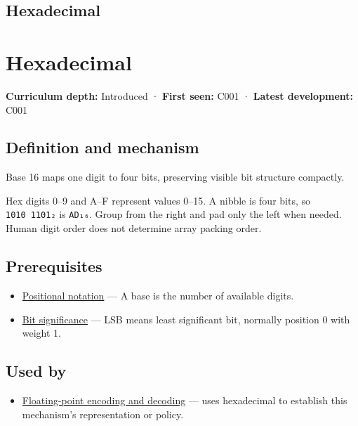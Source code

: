 \hypertarget{appendix-6b8075763724}{}
\section*{Hexadecimal}
\chapter{Hexadecimal}\label{appendix-6b8075763724-hexadecimal}

\textbf{Curriculum depth:} Introduced · \textbf{First seen:} C001 · \textbf{Latest development:} C001

\section{Definition and mechanism}\label{appendix-6b8075763724-definition-and-mechanism}

Base 16 maps one digit to four bits, preserving visible bit structure compactly.

Hex digits 0--9 and A--F represent values 0--15. A nibble is four bits, so \texttt{1010\ 1101₂} is \texttt{AD₁₆}. Group from the right and pad only the left when needed. Human digit order does not determine array packing order.

\section{Prerequisites}\label{appendix-6b8075763724-prerequisites}

\begin{itemize}
\tightlist
\item
  \hyperref[appendix-83c3f28f7bda]{Positional notation} --- A base is the number of available digits.
\item
  \hyperref[appendix-280445746493]{Bit significance} --- LSB means least significant bit, normally position 0 with weight 1.
\end{itemize}

\section{Used by}\label{appendix-6b8075763724-used-by}

\begin{itemize}
\tightlist
\item
  \hyperref[appendix-6854d0e2218e]{Floating-point encoding and decoding} --- uses hexadecimal to establish this mechanism's representation or policy.
\end{itemize}


